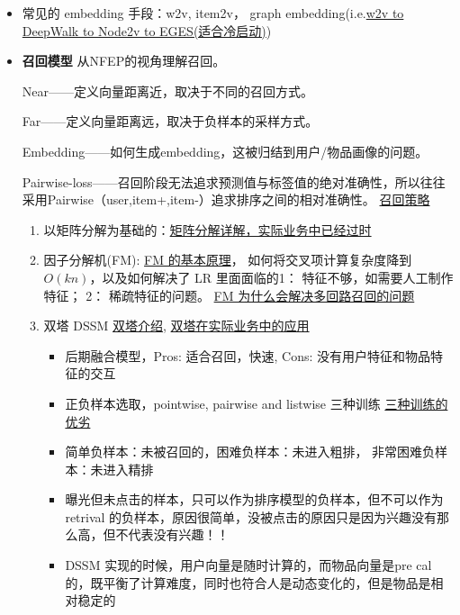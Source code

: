 \documentclass[12pt]{article}
\numberwithin{theorem}{section} %
\numberwithin{definition}{section} %
\numberwithin{assumption}{section} %
\numberwithin{lemma}{section} %
\numberwithin{remark}{section} %
\numberwithin{prop}{section} %
\numberwithin{corollary}{section} %
\numberwithin{example}{section} %
\numberwithin{question}{section} %
\numberwithin{problem}{section} %
\numberwithin{conjecture}{section} %
\numberwithin{append}{section} %
\numberwithin{property}{section} %
\begin{document}
\begin{CJK}{UTF8}{gbsn}
\begin{itemize}
	\item 常见的 embedding 手段：w2v, item2v， graph embedding(i.e.\href{https://zhuanlan.zhihu.com/p/64200072}{w2v to DeepWalk to Node2v to EGES(适合冷启动)})
	
	\item \textbf{召回模型} 从NFEP的视角理解召回。
	
	Near——定义向量距离近，取决于不同的召回方式。
	
	Far——定义向量距离远，取决于负样本的采样方式。
	
	Embedding——如何生成embedding，这被归结到用户/物品画像的问题。
	
	Pairwise-loss——召回阶段无法追求预测值与标签值的绝对准确性，所以往往采用Pairwise（user,item+,item-）追求排序之间的相对准确性。 \href{https://www.zhihu.com/question/315120636/answer/1687203383}{召回策略}
	\begin{enumerate}
		\item 以矩阵分解为基础的：\href{https://lumingdong.cn/recommendation-algorithm-based-on-matrix-decomposition.html}{矩阵分解详解，实际业务中已经过时}
		\item 因子分解机(FM): \href{https://www.cnblogs.com/techflow/p/14893349.html}{FM 的基本原理}， 如何将交叉项计算复杂度降到$O(kn)$，以及如何解决了 LR 里面面临的1： 特征不够，如需要人工制作特征； 2： 稀疏特征的问题。 \href{https://zhuanlan.zhihu.com/p/58160982}{FM 为什么会解决多回路召回的问题}
		\item 双塔 DSSM \href{https://zhuanlan.zhihu.com/p/430503952}{双塔介绍}, \href{https://www.6aiq.com/article/1589485687711}{双塔在实际业务中的应用}
		\begin{itemize}
			\item 后期融合模型，Pros: 适合召回，快速, Cons: 没有用户特征和物品特征的交互
			\item 正负样本选取，pointwise, pairwise and listwise 三种训练 \href{https://zhuanlan.zhihu.com/p/111636490}{三种训练的优劣}
			\item 简单负样本：未被召回的，困难负样本：未进入粗排， 非常困难负样本：未进入精排
			\item 曝光但未点击的样本，只可以作为排序模型的负样本，但不可以作为retrival 的负样本，原因很简单，没被点击的原因只是因为兴趣没有那么高，但不代表没有兴趣！！
			\item DSSM 实现的时候，用户向量是随时计算的，而物品向量是pre cal的，既平衡了计算难度，同时也符合人是动态变化的，但是物品是相对稳定的
		\end{itemize}
	\end{enumerate}
	

\end{itemize}
\end{CJK}
\end{document}
